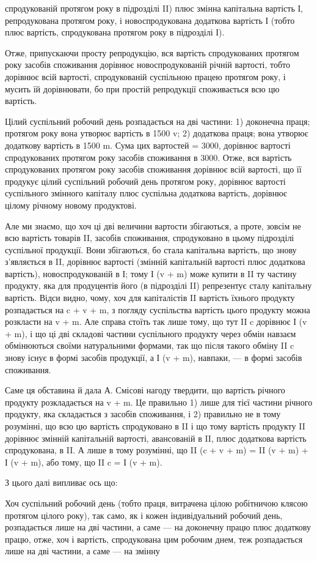 \parcont{}  %
спродукованій протягом року в підрозділі II) плюс змінна капітальна
вартість І, репродукована протягом року, і новоспродукована додаткова
вартість І (тобто плюс вартість, спродукована протягом року в підрозділі
І).

Отже, припускаючи просту репродукцію, вся вартість спродукованих
протягом року засобів споживання дорівнює новоспродукованій річній
вартості, тобто дорівнює всій вартості, спродукованій суспільною працею
протягом року, і мусить їй дорівнювати, бо при простій репродукції
споживається всю цю вартість.

Цілий суспільний робочий день розпадається на дві частини: 1) доконечна
праця; протягом року вона утворює вартість в 1500 v; 2) додаткова
праця; вона утворює додаткову вартість в 1500 m. Сума цих
вартостей = 3000, дорівнює вартості спродукованих протягом року засобів
споживання в 3000. Отже, вся вартість спродукованих протягом
року засобів споживання дорівнює всій вартості, що її продукує цілий
суспільний робочий день протягом року, дорівнює вартості суспільного змінного
капіталу плюс суспільна додаткова вартість, дорівнює цілому річному
новому продуктові.

Але ми знаємо, що хоч ці дві величини вартости збігаються, а проте,
зовсім не всю вартість товарів II, засобів споживання, спродуковано
в цьому підрозділі суспільної продукції. Вони збігаються, бо стала
капітальна вартість, що знову з’являється в II, дорівнює вартості (змінній
капітальній вартості плюс додаткова вартість), новоспродукованій
в І; тому І (v + m) може купити в II ту частину продукту, яка для продуцентів
його (в підрозділі II) репрезентує сталу капітальну вартість. Відси
видно, чому, хоч для капіталістів II вартість їхнього продукту розпадається
на c + v + m, з погляду суспільства вартість цього продукту
можна розкласти на v + m. Але справа стоїть так лише тому, що тут
II c дорівнює І (v + m), і що ці дві складові частини суспільного продукту
через обмін навзаєм обмінюються своїми натуральними формами,
так що після такого обміну II c знову існує в формі засобів продукції,
а І (v + m), навпаки, — в формі засобів споживання.

Саме ця обставина й дала А. Смісові нагоду твердити, що вартість
річного продукту розкладається на v + m. Це правильно 1) лише для
тієї частини річного продукту, яка складається з засобів споживання, і
2) правильно не в тому розумінні, що всю цю вартість спродуковано в II і
що тому вартість продукту II дорівнює змінній капітальній вартості, авансованій
в II, плюс додаткова вартість спродукована, в II. А лише в тому
розумінні, що II (c + v + m) = II (v + m) + І (v + m), або тому, що
II c = І (v + m).

З цього далі випливає ось що:

Хоч суспільний робочий день (тобто праця, витрачена цілою робітничою
клясою протягом цілого року), так само, як і кожен індивідуальний
робочий день, розпадається лише на дві частини, а саме — на доконечну
працю плюс додаткову працю, отже, хоч і вартість, спродукована цим
робочим днем, теж розпадається лише на дві частини, а саме — на змінну
\parbreak{}  %
